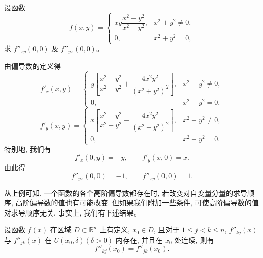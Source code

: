 \documentclass[UTF8,12pt,a4paper,fontset=fandol]{ctexart}
\begin{document}
\begin{example}\label{course-example-14-2-7}\quad 设函数
\[
  f(x,y)=
  \begin{cases}
    xy\dfrac{x^2-y^2}{x^2+y^2}, &x^2+y^2\ne0,\\
    0, &x^2+y^2=0,
  \end{cases}
\]
求 $f''_{xy}(0,0)$ 及 $f''_{yx}(0,0)$。

\end{example}
\begin{solve}\quad 由偏导数的定义得
\[
  f'_x(x,y)=
  \begin{cases}
    y\left[\dfrac{x^2-y^2}{x^2+y^2}+\dfrac{4x^2y^2}{(x^2+y^2)^2}\right], &x^2+y^2\ne0,\\
    0, &x^2+y^2=0,
  \end{cases}
\]
\[
  f'_y(x,y)=
  \begin{cases}
    x\left[\dfrac{x^2-y^2}{x^2+y^2}-\dfrac{4x^2y^2}{(x^2+y^2)^2}\right], &x^2+y^2\ne0,\\
    0, &x^2+y^2=0.
  \end{cases}
\]
特别地, 我们有
\[
  f'_x(0,y)=-y,\qquad f'_y(x,0)=x.
\]
由此得
\[
  f''_{yx}(0,0)=-1,\qquad f''_{xy}(0,0)=1.
\]

从上例可知, 一个函数的各个高阶偏导数都存在时, 若改变对自变量分量的求导顺序, 高阶偏导数的值也有可能改变. 但如果我们附加一些条件, 可使高阶偏导数的值对求导顺序无关. 事实上, 我们有下述结果。

\end{solve}
\begin{theorem}\label{course-theorem-14-2-3}\quad 设函数 $f(x)$ 在区域 $D\subset\mathbb R^n$ 上有定义, $x_0\in D$, 且对于 $1\leqslant j<k\leqslant n$, $f''_{kj}(x)$ 与 $f''_{jk}(x)$ 在 $U(x_0,\delta)(\delta>0)$ 内存在, 并且在 $x_0$ 处连续, 则有
\[
  f''_{kj}(x_0)=f''_{jk}(x_0).
\]

\end{theorem}
\end{document}

